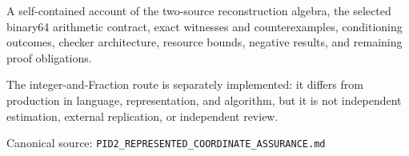 {\begin{titlepage}
\begin{minipage}{0.88\textwidth}
      \large
      A self-contained account of the two-source reconstruction algebra, the selected binary64
      arithmetic contract, exact witnesses and counterexamples, conditioning outcomes, checker
      architecture, resource bounds, negative results, and remaining proof obligations.
    \end{minipage}\par
    \vfill
    \begin{minipage}{0.90\textwidth}
      \small\color{PidSlate}
      The integer-and-Fraction route is separately implemented: it differs from production in
      language, representation, and algorithm, but it is not independent estimation, external
      replication, or independent review.
    \end{minipage}\par
    \vspace{11mm}
    {\large\color{PidInk}\@author\par}
    \vspace{3mm}
    {\large\color{PidInk}\@date\par}
    \vspace{3mm}
    {\small\color{PidSlate}Canonical source: \texttt{PID2\_REPRESENTED\_COORDINATE\_ASSURANCE.md}\par}
    \vspace{17mm}
  \end{titlepage}
  \hypersetup{pageanchor=true}%
  \setcounter{page}{1}%
  \pagecolor{PidIvory}\color{PidInk}
}
\makeatother
